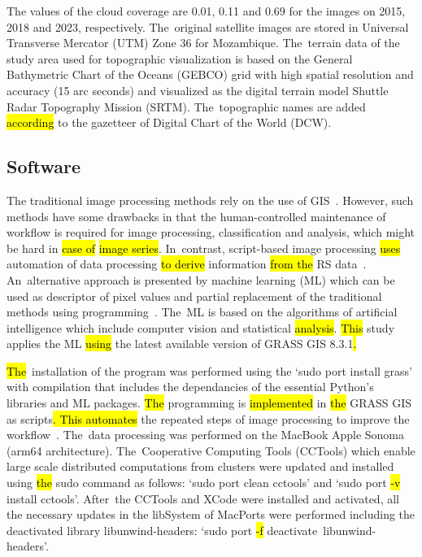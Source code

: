 \documentclass[coasts,article,accept,pdftex,oneauthor]{Definitions/mdpi}
\begin{document}
The {values of the }cloud {coverage are} 0.01, 0.11 and 0.69 for the images on 2015, 2018 and 2023, respectively. The~original satellite images are stored in Universal Transverse Mercator (UTM) Zone 36 for Mozambique. The~terrain data of the study area used for topographic visualization is based on the General Bathymetric Chart of the Oceans (GEBCO) grid with high spatial resolution and accuracy (15 arc seconds) and visualized as the digital terrain model Shuttle Radar Topography Mission (SRTM). The~topographic names are added \hl{according} to the gazetteer of Digital Chart of the World (DCW).  

\subsection{Software}

The traditional image processing methods rely on the use of GIS~\cite{GEMUSSE2023101022,LIANG2023113367,BEY2020111611}. However, such methods have some drawbacks in that{ }the human-controlled maintenance of workflow is required for\hl{ }image\hl{ }processing, classification and analysis, which might be hard\hl{ }in \hl{case of } \hl{image series}. In~contrast, script-based image processing \hl{uses} automation of data processing \hl{to derive} information \hl{from the} RS data~\cite{Lemenkova202213}. An~alternative approach is presented by machine learning (ML)\hl{ }which can be used as descriptor\hl{ }of pixel values\hl{ }and partial replacement of the traditional methods using programming~\cite{jimaging9050098,Lemenkova202229}. The~ML\hl{ }is based on {the} algorithms of artificial intelligence which include\hl{ }computer vision and statistical \hl{analysis}. \hl{This} study applies the ML\hl{ using} the latest available version of GRASS GIS 8.3.1\hl{.}

\hl{The}~installation of the program was performed using {the} `sudo port install grass' with compilation {that includes }the\hl{ }dependancies {of} the essential Python's libraries and\hl{ }ML packages. \hl{The }programming is \hl{implemented} in \hl{the }GRASS GIS as scripts\hl{. This automates} the repeated steps of image processing {to improve} the workflow~\cite{technologies11020046,jmse11040871}. The~data processing was performed on the MacBook Apple Sonoma (arm64 {architecture}). The~Cooperative Computing Tools (CCTools) which enable large scale distributed computations from clusters were updated and installed using \hl{the }sudo {command} as follows: `sudo port clean cctools' and `sudo port \hl{-v} %
 install cctools'. After~the CCTools and XCode were installed and activated, {all the }necessary updates in the libSystem of MacPorts were performed including the deactivated library libunwind-headers: `sudo port \hl{-f} deactivate~libunwind-headers'. 
\end{document}
